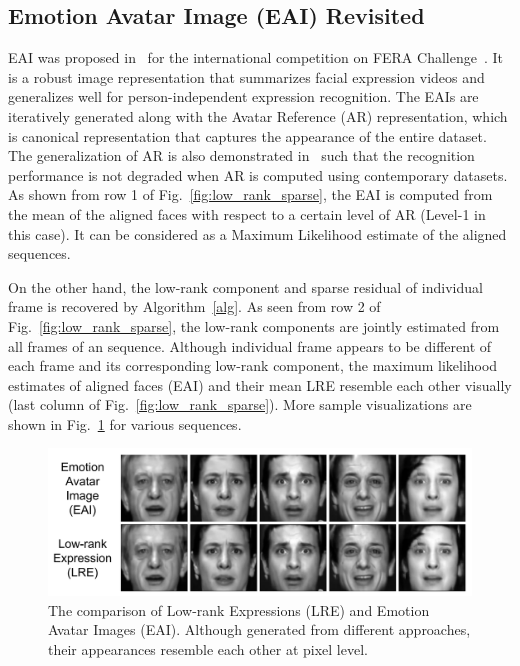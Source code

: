 \documentclass[journal]{IEEEtran}
\begin{document}
\subsection{Emotion Avatar Image (EAI) Revisited\label{sec:eai}}

EAI was proposed in~\cite{Yang_SMCB12} for the international competition on FERA Challenge~\cite{FERA11}. It is a robust image representation that summarizes facial expression videos and generalizes well for person-independent expression recognition. The EAIs are iteratively generated along with the Avatar Reference (AR) representation, which is canonical representation that captures the appearance of the entire dataset. The generalization of AR is also demonstrated in~\cite{Yang_SMCB12} such that the recognition performance is not degraded when AR is computed using contemporary datasets. As shown from row 1 of Fig.~\ref{fig:low_rank_sparse}, the EAI is computed from the mean of the aligned faces with respect to a certain level of AR (Level-1 in this case). It can be considered as a Maximum Likelihood estimate of the aligned sequences. 

On the other hand, the low-rank component and sparse residual of individual frame is recovered by Algorithm~\ref{alg}. As seen from row 2 of Fig.~\ref{fig:low_rank_sparse}, the low-rank components are jointly estimated from all frames of an sequence. Although individual frame appears to be different of each frame and its corresponding low-rank component, the maximum likelihood estimates of aligned faces (EAI) and their mean LRE resemble each other visually (last column of Fig.~\ref{fig:low_rank_sparse}). More sample visualizations are shown in Fig.~\ref{fig:eai_lre_compare} for various sequences. 


\begin{figure}[htbp]
	\centering
		\includegraphics[width=\columnwidth]{pics/eai_lre_compare.png}
	\caption{The comparison of Low-rank Expressions (LRE) and Emotion Avatar Images (EAI). Although generated from different approaches, their appearances resemble each other at pixel level.}
	\label{fig:eai_lre_compare}
\end{figure}
\end{document}
